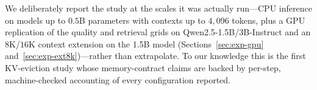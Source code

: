 We deliberately report the study at the scales it was actually run---CPU
inference on models up to $0.5$B parameters with contexts up to $4{,}096$
tokens, plus a GPU replication of the quality and retrieval grids on
Qwen2.5-1.5B/3B-Instruct and an $8$K/$16$K context extension on the
1.5B model (Sections~\ref{sec:exp-gpu} and~\ref{sec:exp-ext8k})---rather
than extrapolate.
To our knowledge this is the first KV-eviction study whose memory-contract
claims are backed by per-step, machine-checked accounting of every
configuration reported.
